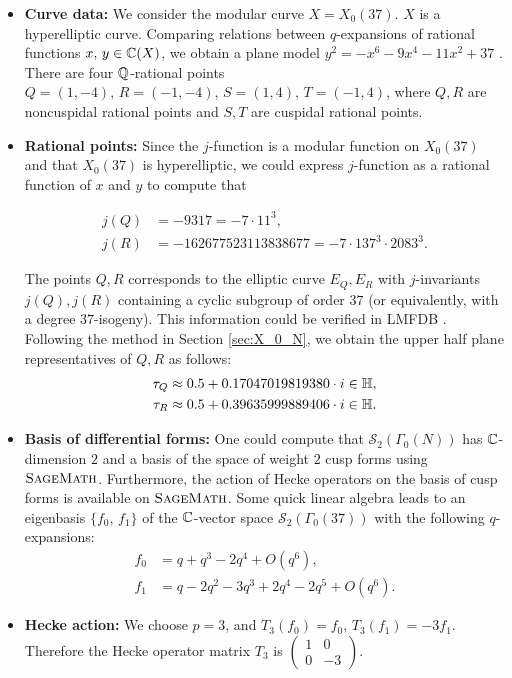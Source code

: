 \begin{itemize}
\item \textbf{Curve data: } We consider the modular curve $X = X_0(37)$. $X$ is a hyperelliptic curve. Comparing relations between $q$-expansions of rational functions $x,\,y \in \mathbb{C}(X)$, we obtain a plane model $y^2 = - x^6 - 9x^4 - 11x^2 + 37$ \cite{maswd}. There are four $\mathbb{Q}$-rational points $Q = (1,-4),\,R = (-1,-4),\, S=(1,4),\,T = (-1,4)$, where $Q,R$ are noncuspidal rational points and $S,T$ are cuspidal rational points.

\item \textbf{Rational points:}  Since the $j$-function is a
modular function on $X_0(37)$ and that $X_0(37)$ is hyperelliptic, we could
express $j$-function as a rational function of $x$ and $y$ to compute
that

\begin{align*}
  j(Q) &= -9317 = - 7 \cdot 11^3, \\
  j(R) &= -162677523113838677= - 7 \cdot 137^3 \cdot 2083^3.
\end{align*}
          

The points $Q,R$ corresponds to the elliptic curve $E_Q,E_R$ with
$j$-invariants $j(Q),j(R)$ containing a cyclic subgroup of order $37$ (or equivalently, with a degree $37$-isogeny). This information could be verified in LMFDB \cite{lmfdb}. Following the method in Section \ref{sec:X_0_N}, we obtain the upper half plane representatives of $Q,R$ as follows: \begin{align*} \tau_Q &\approx 0.5 + 0.17047019819380\cdot i \in \mathbb{H} , \\ \tau_R &\approx 0.5 + 0.39635999889406\cdot i \in \mathbb{H}. \end{align*} 


\item \textbf{Basis of differential forms:} One could compute that $\mathcal{S}_2(\Gamma_0(N))$ has $\mathbb{C}$-dimension $2$ and a basis of the space of weight $2$ cusp forms using $\textsc{SageMath}$. Furthermore, the action of Hecke operators on the basis of cusp forms is available on $\textsc{SageMath}$. Some quick linear algebra leads to an eigenbasis $\{f_0,\,f_1\}$ of the $\mathbb{C}$-vector space $\mathcal{S}_2(\Gamma_0(37))$ with the following $q$-expansions:
\begin{align*} f_0 &= q+q^3-2q^4+O(q^6), \\ f_1 &= q-2q^2-3q^3+2q^4-2q^5+O(q^6) .\end{align*}

\item \textbf{Hecke action:} We choose $p=3$, and $T_3(f_0) = f_0,\,T_3(f_1) = -3f_1$. Therefore the Hecke operator matrix $T_3$ is $\begin{pmatrix}
1&0\\
0&-3
\end{pmatrix}$. 


\end{itemize}
